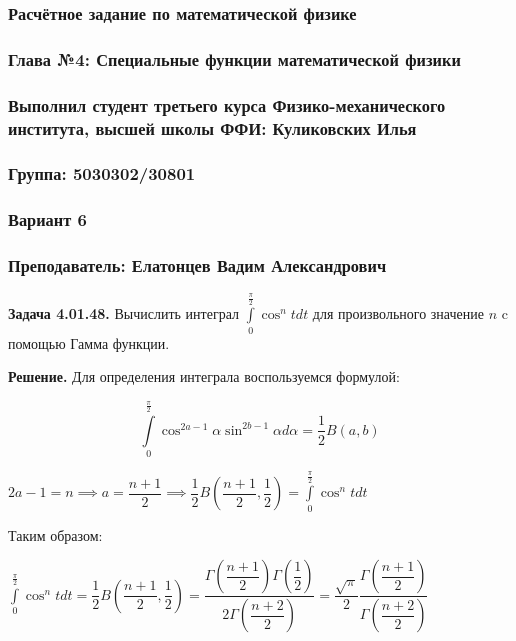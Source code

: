 \documentclass[a4paper, 12pt]{article}
\begin{document}
	\begin{center}
		\subsubsection*{Расчётное задание по математической физике}
		\subsubsection*{Глава №4: Специальные функции математической физики}
		\subsubsection*{Выполнил студент третьего курса Физико-механического института, высшей школы ФФИ: Куликовских Илья}
		\subsubsection*{Группа: 5030302/30801}
		\subsubsection*{Вариант 6}
		\subsubsection*{Преподаватель: Елатонцев Вадим Александрович}
	\end{center}
	
	\quad \textbf{Задача 4.01.48.} Вычислить интеграл $\displaystyle\int\limits_{0}^{\frac{\pi}{2}} \cos^{n} t dt $ для произвольного значение $n$ c помощью Гамма функции. 
	
	\quad \textbf{Решение. } Для определения интеграла воспользуемся формулой: 
	
	\begin{equation}
		\displaystyle\int\limits_{0}^{\frac{\pi}{2}} \cos^{2a - 1} \alpha \sin^{2b-1} \alpha d\alpha = \dfrac{1}{2} B(a, b)
	\end{equation}
	
	\begin{center}
		$2a - 1 = n \implies a = \dfrac{n+1}{2} \implies \dfrac{1}{2}B\left(\dfrac{n+1}{2}, \dfrac{1}{2}\right) = \displaystyle\int\limits_{0}^{\frac{\pi}{2}} \cos^n t dt $
	
		Таким образом: 
		
		$\displaystyle\int\limits_{0}^{\frac{\pi}{2}} \cos^n t dt = \dfrac{1}{2} B\left(\dfrac{n+1}{2}, \dfrac{1}{2}\right) = \dfrac{\Gamma\left(\dfrac{n+1}{2}\right) \Gamma\left(\dfrac{1}{2}\right)}{2\Gamma\left(\dfrac{n+2}{2}\right)} = \dfrac{\sqrt{\pi}}{2}\dfrac{\Gamma\left(\dfrac{n+1}{2}\right)}{\Gamma\left(\dfrac{n+2}{2}\right)}$
	\end{center}
	
\end{document}
